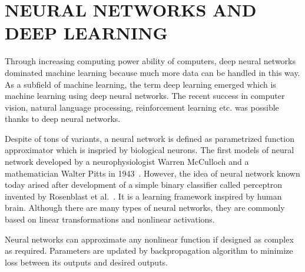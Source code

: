 \chapter{NEURAL NETWORKS AND DEEP LEARNING}
\label{chap:dnns}

Through increasing computing power ability of computers, 
deep neural networks dominated machine learning because much more data can be handled in this way. 
As a subfield of machine learning, the term deep learning emerged which is machine learning using deep neural networks. 
The recent success in computer vision, natural language processing, 
reinforcement learning etc. was possible thanks to deep neural networks. 

Despite of tons of variants, a neural network is defined as parametrized function approximator which is inspried by biological neurons. 
The first models of neural network developed by a neurophysiologist Warren McCulloch and a mathematician Walter Pitts in 1943~\cite{mcculloch_logical_1943}. 
However, the idea of neural network known today arised after development of a simple binary classifier called perceptron invented by Rosenblast et al.~\cite{rosenblatt_perceptron_1958}. 
It is a learning framework inspired by human brain. Although there are many types of neural networks, 
they are commonly based on linear transformations and nonlinear activations.

Neural networks can approximate any nonlinear function if designed as complex as required. 
Parameters are updated by backpropagation algorithm to minimize loss between its outputs and desired outputs.
